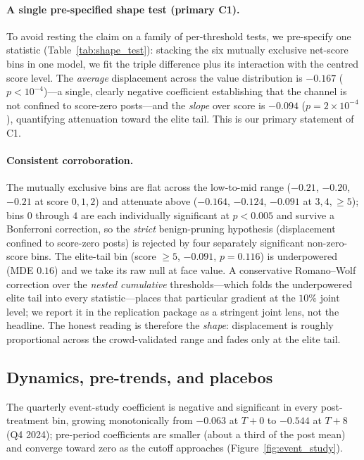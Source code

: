 \paragraph{A single pre-specified shape test (primary C1).}
To avoid resting the claim on a family of per-threshold tests,
we pre-specify one statistic (Table~\ref{tab:shape_test}):
stacking the six mutually exclusive net-score bins in one
model, we fit the triple difference plus its interaction with
the centred score level. The \emph{average} displacement
across the value distribution is $-0.167$ ($p<10^{-4}$)---a
single, clearly negative coefficient establishing that the
channel is not confined to score-zero posts---and the
\emph{slope} over score is $-0.094$ ($p=2\times10^{-4}$),
quantifying attenuation toward the elite tail. This is our
primary statement of C1.



\paragraph{Consistent corroboration.}
The mutually exclusive bins are flat across the low-to-mid
range ($-0.21$, $-0.20$, $-0.21$ at score $0,1,2$) and
attenuate above ($-0.164$, $-0.124$, $-0.091$ at $3,4,\geq5$);
bins $0$ through $4$ are each individually significant at
$p<0.005$ and survive a Bonferroni correction, so the
\emph{strict} benign-pruning hypothesis (displacement confined
to score-zero posts) is rejected by four separately
significant non-zero-score bins. The elite-tail bin
(score $\geq5$, $-0.091$, $p=0.116$) is underpowered
(MDE $0.16$) and we take its raw null at face value. A
conservative Romano--Wolf correction over the \emph{nested
cumulative} thresholds---which folds the underpowered elite
tail into every statistic---places that particular gradient at
the $10\%$ joint level; we report it in the replication
package as a stringent joint lens, not the headline. The
honest reading is therefore the \emph{shape}: displacement is
roughly proportional across the crowd-validated range and
fades only at the elite tail.

\subsection{Dynamics, pre-trends, and
placebos}\label{ssec:dynamics_event}

The quarterly event-study coefficient is negative and
significant in every post-treatment bin, growing
monotonically from $-0.063$ at $T{+}0$ to $-0.544$ at
$T{+}8$ (Q4 2024); pre-period coefficients are smaller (about
a third of the post mean) and converge toward zero as the
cutoff approaches (Figure~\ref{fig:event_study}).


